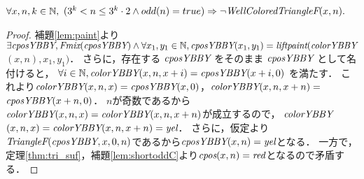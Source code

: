 \begin{lem}[\ShortOdd] \label{lem:shortodd}
  $\forall x, n, k \in \mathbb{N},$
  $(3^k < n \leq 3^k \cdot 2 \land odd(n) = true) \Rightarrow \lnot\textit{WellColoredTriangleF}(x,n).$
\end{lem}
\begin{proof}
  補題\ref{lem:paint}より
  $\exists \textit{cposYBBY}, \textit{Fmix}(\textit{cposYBBY}) \land \forall x_1, y_1 \in \mathbb{N}, \textit{cposYBBY}(x_1,y_1) = \textit{liftpaint}(\textit{colorYBBY}$ $(x,n),x_1,y_1)$．
  さらに，存在する $\textit{cposYBBY}$ をそのまま $\textit{cposYBBY}$ として名付けると，
  $\forall i \in \mathbb{N}, \textit{colorYBBY}(x,n,x+i) = \textit{cposYBBY}(x+i,0)$ を満たす．
  これより$\textit{colorYBBY}(x,n,x) = \textit{cposYBBY}(x,0)$，$\textit{colorYBBY}(x,n,x+n) = $
  $\textit{cposYBBY}(x+n,0)$．
  $n$が奇数であるから$\textit{colorYBBY}(x,n,x)=\textit{colorYBBY}(x,n,x+n)$が成立するので，
  $\textit{colorYBBY}$ $(x,n,x)=\textit{colorYBBY}(x,n,x+n)=\textit{yel}$．
  さらに，仮定より$\textit{TriangleF}(\textit{cposYBBY},x,0,n)$であるから$\textit{cposYBBY}(x,n)=\textit{yel}$となる．
  一方で，定理\ref{thm:tri_suf}，補題\ref{lem:shortoddC}より$\textit{cpos}(x,n)=\textit{red}$となるので矛盾する．
\end{proof}


